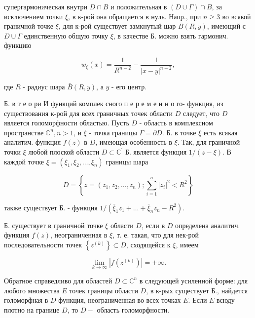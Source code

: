 \documentclass[10pt]{article}
\begin{document}
супергармоническая внутри $D \cap B$ и положительная в $(D \cup \Gamma) \cap B$, за исключением точки $\xi$, в к-рой она обращается в нуль. Напр., при $n \geqslant 3$ во всякой граничной точке $\xi$, для к-рой существует замкнутый шар $\bar{B}(R, y)$, имеющий с $D \cup \Gamma$ единственную общую точку $\xi$, в качестве Б. можно взять гармонич. функцию



\[

w_{\xi}(x)=\frac{1}{R^{n-2}}-\frac{1}{|x-y|^{n-2}},

\]



где $R$ - радиус шара $\bar{B}(R, y)$, а $y$ - его центр.



Б. в т е о ри И функций комплек сного п е р е м е н н о го- функция, из существования к-рой для всех граничных точек области $D$ следует, что $D$ является голоморфности областью. Пусть $D$ - область в комплексном пространстве $\mathbb{C}^{n}, n>1$, и $\xi$ - точка границы $\Gamma=\partial D$. Б. в точке $\xi$ есть всякая аналитич. функция $f(z)$ в $D$, имеющая особенность в $\xi$. Так, для граничной точки $\xi$ любой плоской области $D \subset \mathbb{C}^{\prime}$ Б. является функция $1 /(z-\xi)$. В каждой точке $\xi=\left(\xi_{1}, \xi_{2}, \ldots, \xi_{n}\right)$ границы шара



\[

D=\left\{z=\left(z_{1}, z_{2}, \ldots, z_{n}\right) ; \sum_{i=1}^{n}\left|z_{i}\right|^{2}<R^{2}\right\}

\]



также существует Б. - функция $1 /\left(\bar{\xi}_{1} z_{1}+\ldots+\bar{\xi}_{n} z_{n}-R^{2}\right)$.



Б. существует в граничной точке $\xi$ области $D$, если в $D$ определена аналитич. функция $f(z)$, неограниченная в $\xi$, т. е. такая, что для нек-рой последовательности точек $\left\{z^{(k)}\right\} \subset D$, сходящейся к $\xi$, имеем



\[

\lim _{k \rightarrow \infty}\left|f\left(z^{(k)}\right)\right|=+\infty .

\]



Обратное справедливо для областей $D \subset \mathbb{C}^{n}$ в следующей усиленной форме: для любого множества $E$ точек границы области $D$, в к-рых существует Б., найдется голоморфная в $D$ функция, неограниченная во всех точках $E$. Если $E$ всюду плотно на границе $D$, то $D-$ область голоморфности.
\end{document}
